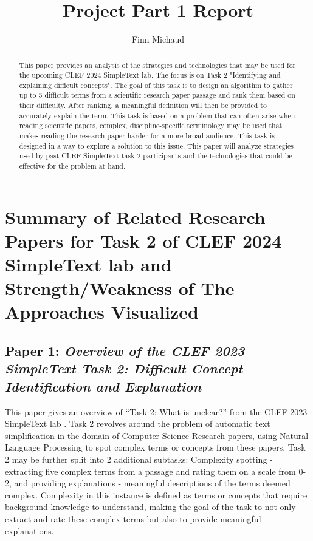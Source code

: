 \documentclass[runningheads]{llncs}
\begin{document}
%
\title{Project Part 1 Report}
%
\author{Finn Michaud}


\maketitle              
%
\begin{abstract}
\centering
This paper provides an analysis of the strategies and technologies that may be used for the upcoming CLEF 2024 SimpleText lab. The focus is on Task 2 "Identifying and explaining difficult concepts". The goal of this task is to design an algorithm to gather up to 5 difficult terms from a scientific research paper passage and rank them based on their difficulty. After ranking, a meaningful definition will then be provided to accurately explain the term. This task is based on a problem that can often arise when reading scientific papers, complex, discipline-specific terminology may be used that makes reading the research paper harder for a more broad audience. This task is designed in a way to explore a solution to this issue. This paper will analyze strategies used by past CLEF SimpleText task 2 participants and the technologies that could be effective for the problem at hand. 

\end{abstract}
%
\section{Summary of Related Research Papers for Task 2 of CLEF 2024 SimpleText lab and Strength/Weakness of The Approaches Visualized}

\subsection{Paper 1: \textit{Overview of the CLEF 2023 SimpleText Task 2: Difficult Concept Identification and Explanation}}
This paper gives an overview of “Task 2: What is unclear?” from the CLEF 2023 SimpleText lab \cite{Paper 1}. Task 2 revolves around the problem of automatic text simplification in the domain of Computer Science Research papers, using Natural Language Processing to spot complex terms or concepts from these papers. Task 2 may be further split into 2 additional subtasks: Complexity spotting - extracting five complex terms from a passage and rating them on a scale from 0-2, and providing explanations - meaningful descriptions of the terms deemed complex. Complexity in this instance is defined as terms or concepts that require background knowledge to understand, making the goal of the task to not only extract and rate these complex terms but also to provide meaningful explanations.
\end{document}
